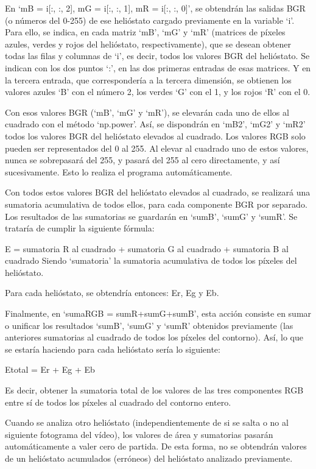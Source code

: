 En ‘mB = i[:, :, 2], mG = i[:, :, 1], mR = i[:, :, 0]’, se obtendrán las salidas BGR (o números del 0-255) de ese helióstato cargado previamente en la variable ‘i’. Para ello, se indica, en cada matriz ‘mB’, ‘mG’ y ‘mR’ (matrices de píxeles azules, verdes y rojos del helióstato, respectivamente), que se desean obtener todas las filas y columnas de ‘i’, es decir, todos los valores BGR del helióstato. Se indican con los dos puntos ‘:’, en las dos primeras entradas de esas matrices. Y en la tercera entrada, que correspondería a la tercera dimensión, se obtienen los valores azules ‘B’ con el número 2, los verdes ‘G’ con el 1, y los rojos ‘R’ con el 0.

Con esos valores BGR (‘mB’, ‘mG’ y ‘mR’), se elevarán cada uno de ellos al cuadrado con el método ‘np.power’. Así, se dispondrán en ‘mB2’, ‘mG2’ y ‘mR2’ todos los valores BGR del helióstato elevados al cuadrado. Los valores RGB solo pueden ser representados del 0 al 255. Al elevar al cuadrado uno de estos valores, nunca se sobrepasará del 255, y pasará del 255 al cero directamente, y así sucesivamente. Esto lo realiza el programa automáticamente.

Con todos estos valores BGR del helióstato elevados al cuadrado, se realizará una sumatoria acumulativa de todos ellos, para cada componente BGR por separado. Los resultados de las sumatorias se guardarán en ‘sumB’, ‘sumG’ y ‘sumR’. Se trataría de cumplir la siguiente fórmula:

E = sumatoria R al cuadrado + sumatoria G al cuadrado + sumatoria B al cuadrado
Siendo ‘sumatoria’ la sumatoria acumulativa de todos los píxeles del helióstato.

Para cada helióstato, se obtendría entonces: Er, Eg y Eb.
           
Finalmente, en ‘sumaRGB = sumR+sumG+sumB’, esta acción consiste en sumar o unificar los resultados ‘sumB’, ‘sumG’ y ‘sumR’ obtenidos previamente (las anteriores sumatorias al cuadrado de todos los píxeles del contorno). Así, lo que se estaría haciendo para cada helióstato sería lo siguiente:

Etotal = Er + Eg + Eb

Es decir, obtener la sumatoria total de los valores de las tres componentes RGB entre sí de todos los píxeles al cuadrado del contorno entero.

Cuando se analiza otro helióstato (independientemente de si se salta o no al siguiente fotograma del vídeo), los valores de área y sumatorias pasarán automáticamente a valer cero de partida. De esta forma, no se obtendrán valores de un helióstato acumulados (erróneos) del helióstato analizado previamente.


